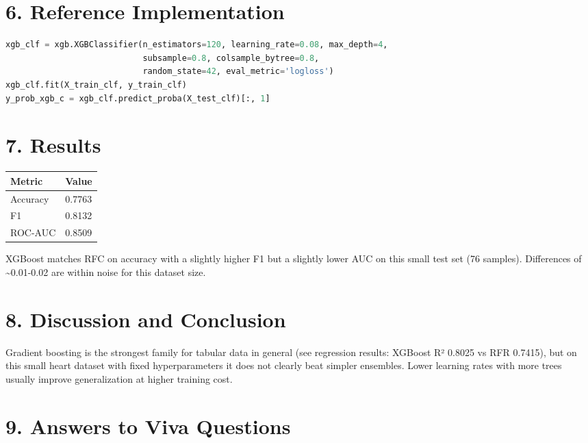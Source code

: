 \section{6. Reference Implementation}\label{reference-implementation-2}

\begin{lstlisting}[language=Python]
xgb_clf = xgb.XGBClassifier(n_estimators=120, learning_rate=0.08, max_depth=4,
                            subsample=0.8, colsample_bytree=0.8,
                            random_state=42, eval_metric='logloss')
xgb_clf.fit(X_train_clf, y_train_clf)
y_prob_xgb_c = xgb_clf.predict_proba(X_test_clf)[:, 1]
\end{lstlisting}

\section{7. Results}\label{results-2}

{\def\LTcaptype{none} %
\begin{longtable}[]{@{}ll@{}}
\toprule\noalign{}
Metric & Value \\
\midrule\noalign{}
\endhead
\bottomrule\noalign{}
\endlastfoot
Accuracy & 0.7763 \\
F1 & 0.8132 \\
ROC-AUC & 0.8509 \\
\end{longtable}
}

XGBoost matches RFC on accuracy with a slightly higher F1 but a slightly
lower AUC on this small test set (76 samples). Differences of
\textasciitilde0.01-0.02 are within noise for this dataset size.

\section{8. Discussion and
Conclusion}\label{discussion-and-conclusion-2}

Gradient boosting is the strongest family for tabular data in general
(see regression results: XGBoost R² 0.8025 vs RFR 0.7415), but on this
small heart dataset with fixed hyperparameters it does not clearly beat
simpler ensembles. Lower learning rates with more trees usually improve
generalization at higher training cost.

\section{9. Answers to Viva
Questions}\label{answers-to-viva-questions-2}

